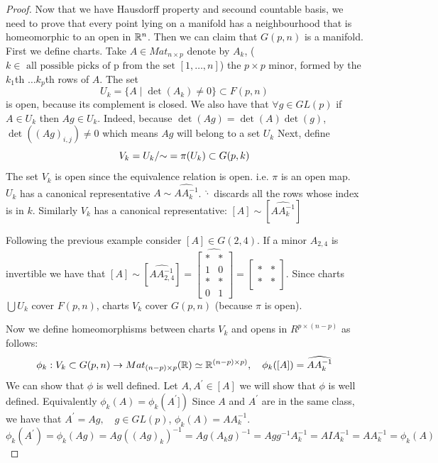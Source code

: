 \documentclass[11pt,a4paper]{report}
\begin{document}
\begin{proof}
Now that we have Hausdorff property and secound countable basis, we need to prove that every point lying on a manifold has a neighbourhood that is homeomorphic to an open in $\mathbb{R}^n$.
Then we can claim that $G(p,n)$ is a manifold.
\newline
First we define charts. Take $A \in Mat_{n \times p} $ denote by $A_{k}$, ($ k \in \text{ all possible picks of p from the set } [1, \dots , n] $) the $p \times p$ minor, formed by the $k_1$th $\dots k_p$th rows of $A$.
The set
$$ U_{k} = \{ A \; | \; \det(A_{k}) \neq 0 \} \subset F(p,n)$$ is open, because its complement is closed. 
We also have that $\forall g \in GL(p)$ if $A \in U_{k}$ then $ Ag \in U_{k}$. 
Indeed, because $\det(Ag) = \det(A) \det(g)$, $\det( (Ag)_{i,j}) \neq 0$ which means $Ag$  will belong to a set $U_{k}$ 
Next, define
$$V_{k} = U_{k}/{\sim} = \pi (U_{k}) \subset G(p,k)$$
The set $V_{k}$ is open since the equivalence relation is open. i.e. $\pi$ is an open map.
\newline
$U_k$ has a canonical representative $A \sim \widehat{A A_{k}^{-1}}$. $\widehat{\cdot}$ discards all the rows whose index is in $k$.
Similarly $V_k$ has a canonical representative: $[A] \sim [\widehat{A A_{k}^{-1}}] $

\begin{Ex}
Following the previous example consider $ [A] \in G(2,4)$.
If a minor $A_{2,4}$ is invertible we have that
$
[A] \sim [\widehat{A A_{2,4}^{-1}}] = 
\widehat{\begin{bmatrix}
* & * \\
1 & 0 \\
* & * \\
0 & 1
\end{bmatrix}} = \begin{bmatrix}  * & * \\ * & * \end{bmatrix}
$.
Since charts $ \bigcup U_k$ cover $F(p,n)$, charts $V_k$ cover $G(p,n)$ (because $\pi$ is open).
\end{Ex}
Now we define homeomorphisms between charts $V_k$ and opens in $R^{p \times (n-p)}$ as follows:
$$ \phi_{k}: V_{k} \subset G(p,n) \to Mat_{ (n-p) \times p} (\mathbb{R}) \simeq \mathbb{R}^{ (n-p) \times p) }, \quad \phi_{k}([A]) = \widehat{A A_{k}^{-1}} $$
We can show that $\phi$ is well defined. 
\newline
Let $A, A^\prime \in [A]$ we will show that $\phi$ is well defined. Equivalently $\phi_{k}(A) = \phi_{k}(A^\prime])$
Since $A$ and $A^\prime$ are in the same class, we have that $A^\prime = A g, \quad g \in GL(p) $, $\phi_{k}(A) = A A_{k}^{-1}$.
$$ \phi_{k}(A^\prime) = \phi_{k}(A g) = Ag ((Ag)_{k})^{-1} = Ag( A_{k} g )^{-1} = A g g^{-1} A_{k}^{-1} = A I A_{k}^{-1} = A A_{k}^{-1} = \phi_{k}(A) $$


\end{proof}
\end{document}
